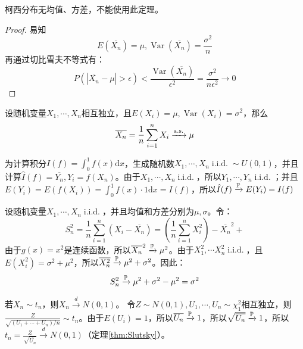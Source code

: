 \begin{remark}
    柯西分布无均值、方差，不能使用此定理。
\end{remark}

\begin{proof}
    易知
    \[ E(\overline{X_n})=\mu,\operatorname{Var}(\overline{X_n})=\frac{\sigma^2}{n} \]
    再通过切比雪夫不等式有：
    \[ P(\left\vert \overline{X_n}-\mu \right\vert >\epsilon)<\frac{\operatorname{Var}(\overline{X_n})}{\epsilon^{2}}=\frac{\sigma^2}{n \epsilon^2} \to 0 \]
\end{proof}

\begin{theorem}[强大数定理]
    设随机变量$X_1,\cdots ,X_n$相互独立，且$E(X_i)=\mu,\operatorname{Var}(X_i)=\sigma^2$，那么
    \[ \overline{X_n}=\frac{1}{n}\sum_{i=1}^n X_i \xrightarrow{\as} \mu \]
\end{theorem}

\begin{example}[蒙特卡洛积分]
    为计算积分$I(f)=\int_0^1 f(x)\mathrm{d}x$，生成随机数$X_1,\cdots ,X_n \operatorname{i.i.d.} \sim U(0,1)$，并且计算$\hat{I}(f)=\overline{Y_n}, Y_i=f(X_n)$。由于$X_1,\cdots ,X_n \operatorname{i.i.d.}$，所以$Y_1,\cdots ,Y_n \operatorname{i.i.d.}$；并且$E(Y_i)=E(f(X_i))=\int_0^1 f(x)\cdot 1\mathrm{d}x=I(f)$，所以$\hat{I}(f)\xrightarrow{\P} E(Y_i)=I(f)$
\end{example}

\begin{example}[样本方差]\label{ex:sample_var}
    设随机变量$X_1,\cdots ,X_n \operatorname{i.i.d.}$，并且均值和方差分别为$\mu,\sigma$。令：
    \[ S_n^2=\frac{1}{n}\sum_{i=1}^n(X_i-\overline{X_n}) =(\frac{1}{n}\sum_{i=1}^nX_i^2)-\overline{X_n}^2 +\]
    由于$g(x)=x^2$是连续函数，所以$\overline{X_n}^2 \xrightarrow{\P} \mu^2$。由于$X_1^2,\cdots X_n^2 \operatorname{i.i.d.}$，且$E(X_i^2)=\sigma^2+\mu^2$，所以$\overline{X_n^2} \xrightarrow{\P} \mu^2+\sigma^2$。因此：
    \[ S_n^2 \xrightarrow{\P}\mu^2+\sigma^2-\mu^2= \sigma^2 \]
\end{example}

\begin{example}\label{ex:t_disc_to_normal}
    若$X_n \sim t_n$，则$X_n \xrightarrow{d} N(0,1)$。
    令$Z \sim N(0,1),U_1,\cdots ,U_n \sim \chi^2_1$相互独立，则$\frac{Z}{\sqrt{(U_1+\cdots+U_n)/n}} \sim t_n$。由于$E(U_i)=1$，所以$\overline{U_n} \xrightarrow{\P} 1$，所以$\sqrt{\overline{U_n}} \xrightarrow{\P} 1$，所以$t_n=\frac{Z}{\sqrt{\overline{U_n}}} \xrightarrow{d} N(0,1)$（定理\ref{thm:Slutsky}）。
\end{example}


